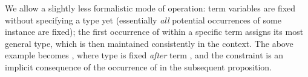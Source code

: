 \begin{isabellebody}
\begin{isamarkuptext}
  We allow a slightly less formalistic mode of operation: term
  variables  are fixed without specifying a type yet
  (essentially \emph{all} potential occurrences of some instance
   are fixed); the first occurrence of 
  within a specific term assigns its most general type, which is then
  maintained consistently in the context.  The above example becomes
  , where type  is fixed \emph{after} term , and the constraint
   is an implicit consequence of the occurrence of
   in the subsequent proposition.


\end{isamarkuptext}
\end{isabellebody}
